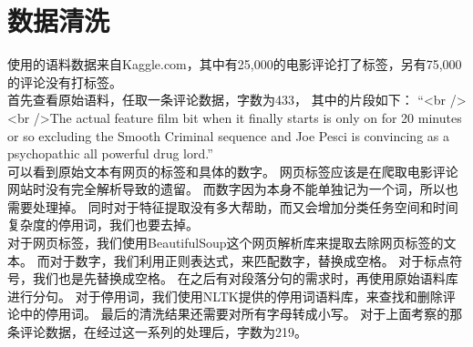 \section{数据清洗}
使用的语料数据来自Kaggle.com，其中有25,000的电影评论打了标签，另有75,000的评论没有打标签。\\
首先查看原始语料，任取一条评论数据，字数为433， 其中的片段如下：
``<br /><br />The actual feature film bit when it finally starts is only on for 20 minutes or so excluding the Smooth Criminal sequence and Joe Pesci is convincing as a psychopathic all powerful drug lord.'' \\
可以看到原始文本有网页的标签和具体的数字。
网页标签应该是在爬取电影评论网站时没有完全解析导致的遗留。
而数字因为本身不能单独记为一个词，所以也需要处理掉。
同时对于特征提取没有多大帮助，而又会增加分类任务空间和时间复杂度的停用词，我们也要去掉。\\
对于网页标签，我们使用BeautifulSoup这个网页解析库来提取去除网页标签的文本。
而对于数字，我们利用正则表达式，来匹配数字，替换成空格。
对于标点符号，我们也是先替换成空格。
在之后有对段落分句的需求时，再使用原始语料库进行分句。
对于停用词，我们使用NLTK提供的停用词语料库，来查找和删除评论中的停用词。
最后的清洗结果还需要对所有字母转成小写。
对于上面考察的那条评论数据，在经过这一系列的处理后，字数为219。